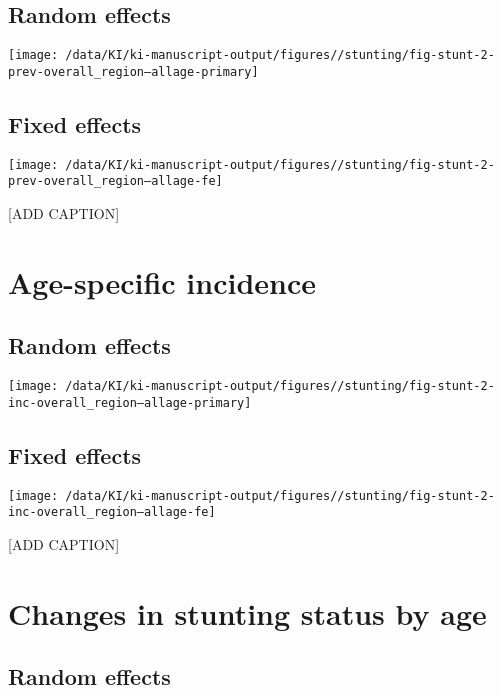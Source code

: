 \documentclass[
  9pt,
]{book}
\begin{document}
\hypertarget{random-effects}{%
\subsection{Random effects}\label{random-effects}}

\texttt{[image: /data/KI/ki-manuscript-output/figures//stunting/fig-stunt-2-prev-overall\_region--allage-primary]}

\hypertarget{fixed-effects-1}{%
\subsection{Fixed effects}\label{fixed-effects-1}}

\texttt{[image: /data/KI/ki-manuscript-output/figures//stunting/fig-stunt-2-prev-overall\_region--allage-fe]}

{[}ADD CAPTION{]}

\hypertarget{age-specific-incidence-2}{%
\section{Age-specific incidence}\label{age-specific-incidence-2}}

\hypertarget{random-effects-1}{%
\subsection{Random effects}\label{random-effects-1}}

\texttt{[image: /data/KI/ki-manuscript-output/figures//stunting/fig-stunt-2-inc-overall\_region--allage-primary]}

\hypertarget{fixed-effects-2}{%
\subsection{Fixed effects}\label{fixed-effects-2}}

\texttt{[image: /data/KI/ki-manuscript-output/figures//stunting/fig-stunt-2-inc-overall\_region--allage-fe]}

{[}ADD CAPTION{]}

\hypertarget{changes-in-stunting-status-by-age}{%
\section{Changes in stunting status by age}\label{changes-in-stunting-status-by-age}}

\hypertarget{random-effects-2}{%
\subsection{Random effects}\label{random-effects-2}}
\end{document}
